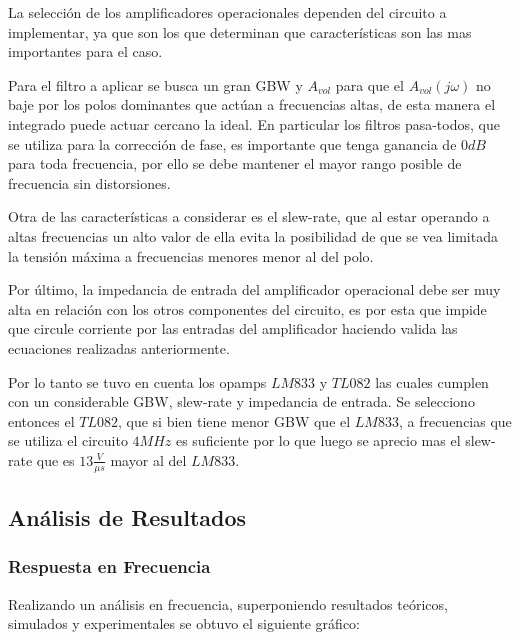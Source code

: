 La selección de los amplificadores operacionales dependen del circuito a implementar, ya que son los que determinan que características son las mas importantes para el caso.

Para el filtro a aplicar se busca un gran GBW y $A_{vol}$ para que el $A_{vol}(j\omega)$ no baje por los polos dominantes que actúan a frecuencias altas, de esta manera el integrado puede actuar cercano la ideal. En particular los filtros pasa-todos, que se utiliza para la corrección de fase, es importante que tenga ganancia de $0dB$ para toda frecuencia, por ello se debe mantener el mayor rango posible de frecuencia sin distorsiones. 

Otra de las características a considerar es el slew-rate, que al estar operando a altas frecuencias un alto valor de ella evita la posibilidad de que se vea limitada la tensión máxima a frecuencias menores menor al del polo. 

Por último, la impedancia de entrada del amplificador operacional debe ser muy alta en relación con los otros componentes del circuito, es por esta que impide que circule corriente por las entradas del amplificador haciendo valida las ecuaciones realizadas anteriormente. 

Por lo tanto se tuvo en cuenta los opamps $LM833$ y $TL082$ las cuales cumplen con un considerable GBW, slew-rate y impedancia de entrada. Se selecciono entonces el $TL082$, que si bien tiene menor GBW que el $LM833$, a frecuencias que se utiliza el circuito $4MHz$ es suficiente por lo que luego se aprecio mas el slew-rate que es $13\frac{V}{\mu s}$ mayor al del $LM833$. 

\subsection{Análisis de Resultados}

\subsubsection{Respuesta en Frecuencia}

Realizando un análisis en frecuencia, superponiendo resultados teóricos, simulados y experimentales se obtuvo el siguiente gráfico:

